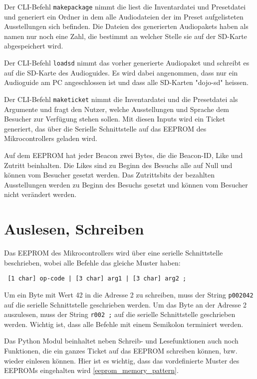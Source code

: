 Der CLI-Befehl \texttt{makepackage} nimmt die liest die Inventardatei und Presetdatei und generiert ein Ordner in dem alle Audiodateien der im Preset aufgelisteten Ausstellungen sich befinden.
Die Dateien des generierten Audiopakets haben als namen nur noch eine Zahl, die bestimmt an welcher Stelle sie auf der SD-Karte abgespeichert wird.

Der CLI-Befehl \texttt{loadsd} nimmt das vorher generierte Audiopaket und schreibt es auf die SD-Karte des Audioguides.
Es wird dabei angenommen, dass nur ein Audioguide am PC angeschlossen ist und dass alle SD-Karten "dojo-sd" heissen.

Der CLI-Befehl \texttt{maketicket} nimmt die Inventardatei und die Presetdatei als Argumente und fragt den Nutzer, welche Ausstellungen und Sprache dem Besucher zur Verfügung stehen sollen. 
Mit diesen Inputs wird ein Ticket generiert, das über die Serielle Schnittstelle auf das EEPROM des Mikrocontrollers geladen wird.

Auf dem EEPROM hat jeder Beacon zwei Bytes, die die Beacon-ID, Like und Zutritt beinhalten.
Die Likes sind zu Beginn des Besuchs alle auf Null und können vom Besucher gesetzt werden.
Das Zutrittsbits der bezahlten Ausstellungen werden zu Beginn des Besuchs gesetzt und können vom Besucher nicht verändert werden.


\section{Auslesen, Schreiben}
Das EEPROM des Mikrocontrollers wird über eine serielle Schnittstelle beschrieben, wobei alle Befehle das gleiche Muster haben:
\begin{verbatim} [1 char] op-code | [3 char] arg1 | [3 char] arg2 ; \end{verbatim}
Um ein Byte mit Wert 42 in die Adresse 2 zu schreiben, muss der String \texttt{p002042} auf die serielle Schnittstelle geschrieben werden.
Um das Byte an der Adresse 2 auszulesen, muss der String \texttt{r002   ;} auf die serielle Schnittstelle geschrieben werden.
Wichtig ist, dass alle Befehle mit einem Semikolon terminiert werden.

Das Python Modul beinhaltet neben Schreib- und Lesefunktionen auch noch Funktionen, die ein ganzes Ticket auf das EEPROM schreiben können, bzw. wieder einlesen können.
Hier ist es wichtig, dass das vordefinierte Muster des EEPROMs eingehalten wird \ref{eeprom_memory_pattern}.


